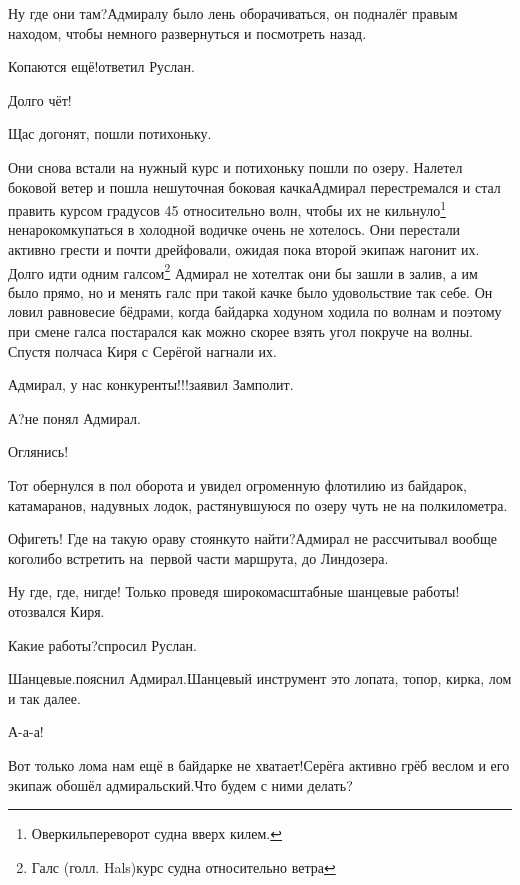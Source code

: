 \diagdash Ну где они там?\mdash Адмиралу было лень оборачиваться, он подналёг правым находом, чтобы немного развернуться и посмотреть назад.

\diagdash Копаются ещё!\mdash ответил Руслан.

\diagdash Долго чёт!

\diagdash Щас догонят, пошли потихоньку.

\renewcommand*{\thefootnote}{\arabic{footnote}}
\setcounter{footnote}{0}
Они снова встали на нужный курс и потихоньку пошли по озеру. Налетел боковой ветер и пошла нешуточная боковая качка\mdash Адмирал перестремался и стал править курсом градусов 45 относительно волн, чтобы их не кильнуло\footnote{Оверкиль\mdash переворот судна вверх килем\cite{МорскойСправочник}.} ненароком\mdash купаться в холодной водичке очень не хотелось. Они перестали активно грести и почти дрейфовали, ожидая пока второй экипаж нагонит их. Долго идти одним галсом\footnote{Галс (голл. Hals)\mdash курс судна относительно ветра\cite{МорскойСправочник}} Адмирал не хотел\mdash так они бы зашли в залив, а им было прямо, но и менять галс при такой качке было удовольствие так себе. Он ловил равновесие бёдрами, когда байдарка ходуном ходила по волнам и поэтому при смене галса постарался как можно скорее взять угол покруче на волны. Спустя полчаса Киря с Серёгой нагнали их.

\diagdash Адмирал, у нас конкуренты!!!\mdash заявил Замполит.

\diagdash А?\mdash не понял Адмирал.

\diagdash Оглянись!

Тот обернулся в пол оборота и увидел огроменную флотилию из байдарок, катамаранов, надувных лодок, растянувшуюся по озеру чуть не на полкилометра. 

\diagdash Офигеть! Где на такую ораву стоянку\sdash то найти?\mdash Адмирал не рассчитывал вообще кого\sdash либо встретить на~первой части маршрута, до Линдозера.

\diagdash Ну где, где, нигде! Только проведя широкомасштабные шанцевые работы!\mdash отозвался Киря.

\diagdash Какие работы?\mdash спросил Руслан.

\diagdash Шанцевые.\mdash пояснил Адмирал.\mdash Шанцевый инструмент это лопата, топор, кирка, лом и так далее.

\diagdash А-а-а!

\diagdash Вот только лома нам ещё в байдарке не хватает!\mdash Серёга активно грёб веслом и его экипаж обошёл адмиральский.\mdash Что будем с ними делать?

